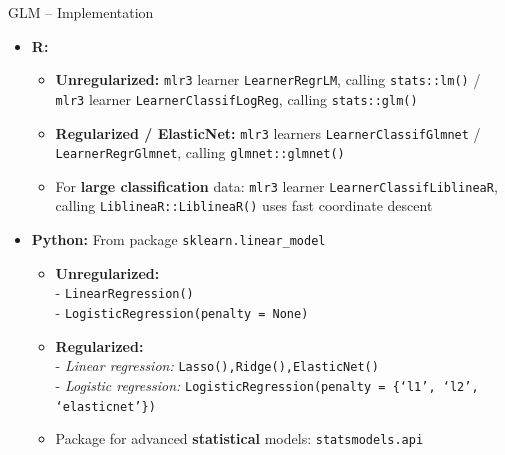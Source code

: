 \begin{frame2}{GLM -- Implementation}

\begin{itemize}
  \item \textbf{R:}
  \begin{itemize}
    \item \textbf{Unregularized:} \texttt{mlr3} learner \texttt{LearnerRegrLM}, 
    calling \texttt{stats::lm()} / \texttt{mlr3} learner 
    \texttt{LearnerClassifLogReg}, calling \texttt{stats::glm()}
    \item \textbf{Regularized / ElasticNet:} \texttt{mlr3} learners 
    \texttt{LearnerClassifGlmnet} / 
    \texttt{LearnerRegrGlmnet}, calling \texttt{glmnet::glmnet()}
    \item For \textbf{large classification} data: \texttt{mlr3} learner     
    \texttt{LearnerClassifLiblineaR}, calling \texttt{LiblineaR::LiblineaR()} uses fast coordinate descent
  \end{itemize}
\end{itemize}

\begin{itemize}
  \item \textbf{Python:} From package \texttt{sklearn.linear\_model} 
  \begin{itemize}
    \item \textbf{Unregularized:}\\ 
    - \texttt{LinearRegression()}\\
    - \texttt{LogisticRegression(penalty = None)}
    \item \textbf{Regularized:}\\
    - \textit{Linear regression:} \texttt{Lasso(),Ridge(),ElasticNet()} \\
    - \textit{Logistic regression:} \texttt{LogisticRegression(penalty = \{‘l1’, ‘l2’, ‘elasticnet’\})}
    \item Package for advanced \textbf{statistical} models: \texttt{statsmodels.api} 
  \end{itemize}
\end{itemize}
\end{frame2}



  
